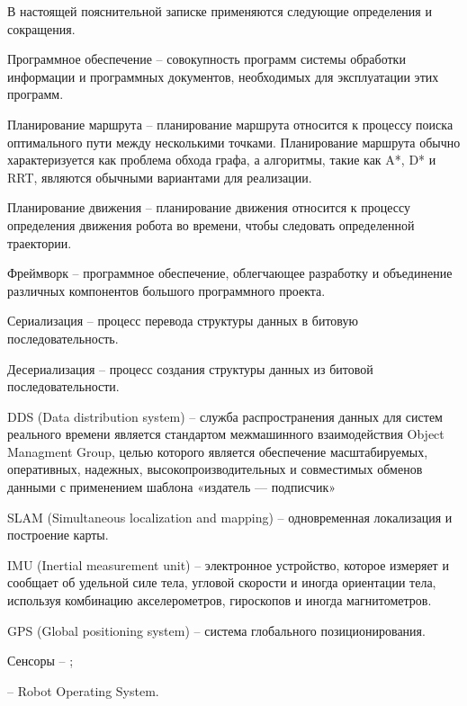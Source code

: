 В настоящей пояснительной записке применяются следующие определения и
сокращения.

Программное обеспечение -- совокупность программ системы обработки
информации и программных документов, необходимых для эксплуатации этих
программ.

Планирование маршрута -- планирование маршрута относится к процессу
поиска оптимального пути между несколькими точками. Планирование маршрута обычно
характеризуется как проблема обхода графа, а алгоритмы, такие как A*, D* и RRT,
являются обычными вариантами для реализации.

Планирование движения -- планирование движения относится к процессу
определения движения робота во времени, чтобы следовать определенной
траектории.

Фреймворк -- программное обеспечение, облегчающее разработку и
объединение различных компонентов большого программного проекта.

Сериализация -- процесс перевода структуры данных в битовую последовательность.

Десериализация -- процесс создания структуры данных из битовой последовательности.

DDS (Data distribution system) -- служба распространения данных для систем
реального времени является стандартом межмашинного взаимодействия Object
Managment Group, целью которого является обеспечение масштабируемых,
оперативных, надежных, высокопроизводительных и совместимых обменов данными с
применением шаблона «издатель — подписчик»

SLAM (Simultaneous localization and mapping) -- одновременная локализация и
построение карты.

IMU (Inertial measurement unit) -- электронное устройство, которое измеряет и
сообщает об удельной силе тела, угловой скорости и иногда ориентации тела,
используя комбинацию акселерометров, гироскопов и иногда магнитометров. 

GPS (Global positioning system) -- система глобального позиционирования.

Сенсоры -- ;

\ros{} -- Robot Operating System.
